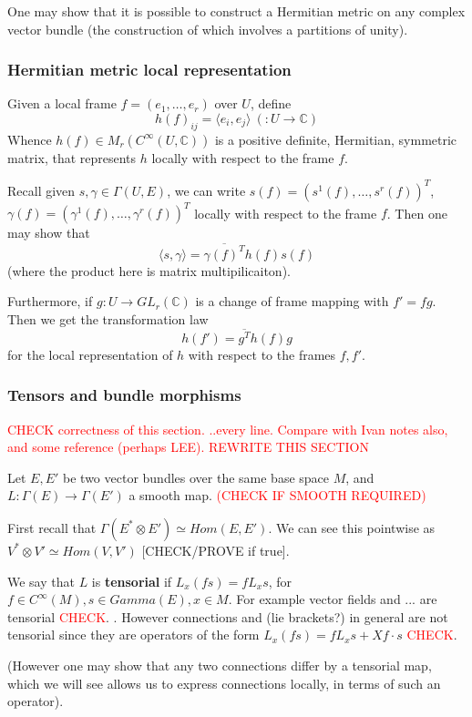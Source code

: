 \documentclass[a4paper]{article}
\theoremstyle{definition} \newtheorem*{definition}{Definition}
\theoremstyle{definition} \newtheorem*{definitions}{Definitions}
\theoremstyle{plain} \newtheorem{theorem}{Theorem}[section]
\theoremstyle{plain} \newtheorem{proposition}[theorem]{Proposition}
\theoremstyle{plain} \newtheorem{corollary}[theorem]{Corollary}
\theoremstyle{plain} \newtheorem{lemma}[theorem]{Lemma}
\theoremstyle{plain} \newtheorem{example}[theorem]{Example}
\newcommand{\checkCorrect}[1]{\textcolor{red}{#1}}
\newcommand{\defn}[1]{\textbf{#1}}
\newcommand{\complexnos}{\mathbb{C}}
\newcommand{\smoothCmaps}{C^\infty (U, \complexnos)}
\begin{document}
One may show that it is possible to construct a Hermitian metric on any complex vector bundle (the construction of which involves a partitions of unity). 

\subsubsection{Hermitian metric local representation}
Given a local frame $f=(e_1, \ldots, e_r)$ over $U$, define 
$$h(f)_{ij}=\langle e_i, e_j \rangle \ (:U\to \complexnos)$$
Whence $h(f)\in M_r(\smoothCmaps)$ is a positive definite, Hermitian, symmetric matrix, that represents $h$ locally with respect to the frame $f$. 

Recall given $s, \gamma\in \Gamma(U, E)$, we can write $s(f)=(s^1(f), \ldots, s^r(f))^T$, $\gamma(f)=(\gamma^1(f), \ldots, \gamma^r(f))^T$ locally with respect to the frame $f$. Then one may show that 
$$\langle s, \gamma \rangle = \overline{\gamma(f)^T}h(f)s(f)$$
(where the product here is matrix multipilicaiton).

Furthermore, if $g:U\to GL_r(\complexnos)$ is a change of frame mapping with $f'=fg$. Then we get the transformation law
$$h(f')=\overline{g^T}h(f)g$$
for the local representation of $h$ with respect to the frames $f, f'$.

\subsubsection{Tensors and bundle morphisms}
\checkCorrect{CHECK correctness of this section. ..every line. Compare with Ivan notes also, and some reference (perhaps LEE). REWRITE THIS SECTION}

Let $E,  E'$ be two vector bundles over the same base space $M$,  and $L:\Gamma(E)\to \Gamma(E')$ a smooth map.  \checkCorrect{(CHECK IF SMOOTH REQUIRED)}

First recall that 
$\Gamma(E^\ast \otimes E') \simeq Hom(E, E')$.  We can see this pointwise as $V^\ast \otimes V' \simeq Hom(V, V')$ [CHECK/PROVE if true].

We say that $L$ is  \defn{tensorial} if $L_x(fs)=f L_x s$, for $f\in C^\infty(M), s\in Gamma(E), x\in M$.  For example vector fields and ... are tensorial  \checkCorrect{CHECK}. .
However connections and (lie brackets?) in general are 
not tensorial since they are operators of the form $L_x(fs)=f L_x s + Xf\cdot s$ \checkCorrect{CHECK}. 

(However one may show that any two connections differ by a tensorial map,  which we will see allows us to express connections locally,  in terms of such an operator). 
\end{document}
